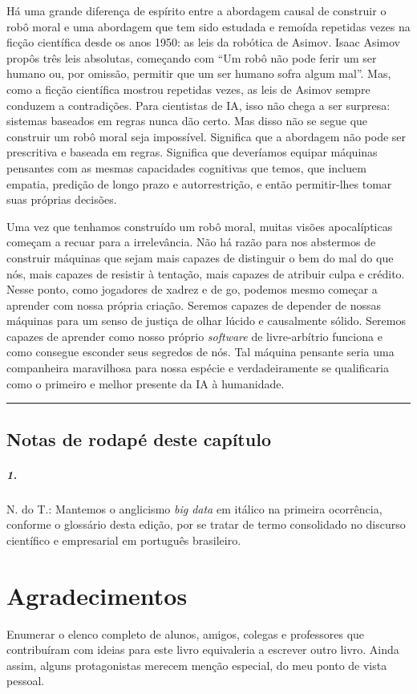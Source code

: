 \documentclass[11pt,a5paper,twoside]{book}
\begin{document}
Há uma grande diferença de espírito entre a abordagem causal de construir o robô moral e uma abordagem que tem sido estudada e remoída repetidas vezes na ficção científica desde os anos 1950: as leis da robótica de Asimov. Isaac Asimov propôs três leis absolutas, começando com “Um robô não pode ferir um ser humano ou, por omissão, permitir que um ser humano sofra algum mal”. Mas, como a ficção científica mostrou repetidas vezes, as leis de Asimov sempre conduzem a contradições. Para cientistas de IA, isso não chega a ser surpresa: sistemas baseados em regras nunca dão certo. Mas disso não se segue que construir um robô moral seja impossível. Significa que a abordagem não pode ser prescritiva e baseada em regras. Significa que deveríamos equipar máquinas pensantes com as mesmas capacidades cognitivas que temos, que incluem empatia, predição de longo prazo e autorrestrição, e então permitir-lhes tomar suas próprias decisões.

Uma vez que tenhamos construído um robô moral, muitas visões apocalípticas começam a recuar para a irrelevância. Não há razão para nos abstermos de construir máquinas que sejam mais capazes de distinguir o bem do mal do que nós, mais capazes de resistir à tentação, mais capazes de atribuir culpa e crédito. Nesse ponto, como jogadores de xadrez e de go, podemos mesmo começar a aprender com nossa própria criação. Seremos capazes de depender de nossas máquinas para um senso de justiça de olhar lúcido e causalmente sólido. Seremos capazes de aprender como nosso próprio \textit{software} de livre-arbítrio funciona e como consegue esconder seus segredos de nós. Tal máquina pensante seria uma companheira maravilhosa para nossa espécie e verdadeiramente se qualificaria como o primeiro e melhor presente da IA à humanidade.

\vspace{1em}\hrule\vspace{1em}
\section*{Notas de rodapé deste capítulo}
\paragraph{1.} N. do T.: Mantemos o anglicismo \textit{big data} em itálico na primeira ocorrência, conforme o glossário desta edição, por se tratar de termo consolidado no discurso científico e empresarial em português brasileiro.
\backmatter
\chapter{Agradecimentos}
Enumerar o elenco completo de alunos, amigos, colegas e professores que contribuíram com ideias para este livro equivaleria a escrever outro livro. Ainda assim, alguns protagonistas merecem menção especial, do meu ponto de vista pessoal.
\end{document}
